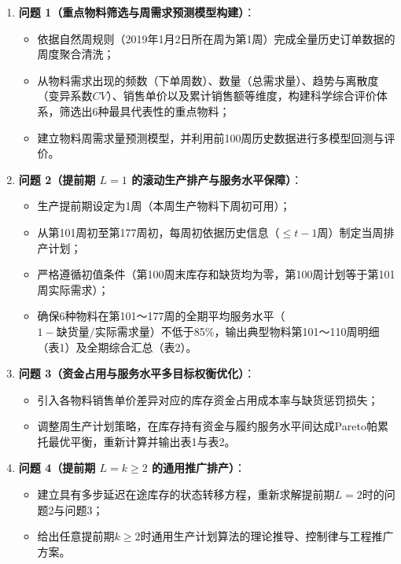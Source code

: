 \begin{enumerate}
\def\labelenumi{\arabic{enumi}.}
\tightlist
\item
  \textbf{问题 1（重点物料筛选与周需求预测模型构建）}：

  \begin{itemize}
  \tightlist
  \item
    依据自然周规则（2019年1月2日所在周为第1周）完成全量历史订单数据的周度聚合清洗；
  \item
    从物料需求出现的频数（下单周数）、数量（总需求量）、趋势与离散度（变异系数\(CV\)）、销售单价以及累计销售额等维度，构建科学综合评价体系，筛选出6种最具代表性的重点物料；
  \item
    建立物料周需求量预测模型，并利用前100周历史数据进行多模型回测与评价。
  \end{itemize}
\item
  \textbf{问题 2（提前期 \(L=1\) 的滚动生产排产与服务水平保障）}：

  \begin{itemize}
  \tightlist
  \item
    生产提前期设定为1周（本周生产物料下周初可用）；
  \item
    从第101周初至第177周初，每周初依据历史信息（\(\le t-1\)周）制定当周排产计划；
  \item
    严格遵循初值条件（第100周末库存和缺货均为零，第100周计划等于第101周实际需求）；
  \item
    确保6种物料在第101～177周的全期平均服务水平（\(1 - \text{缺货量}/\text{实际需求量}\)）不低于85\%，输出典型物料第101～110周明细（表1）及全期综合汇总（表2）。
  \end{itemize}
\item
  \textbf{问题 3（资金占用与服务水平多目标权衡优化）}：

  \begin{itemize}
  \tightlist
  \item
    引入各物料销售单价差异对应的库存资金占用成本率与缺货惩罚损失；
  \item
    调整周生产计划策略，在库存持有资金与履约服务水平间达成Pareto帕累托最优平衡，重新计算并输出表1与表2。
  \end{itemize}
\item
  \textbf{问题 4（提前期 \(L=k \ge 2\) 的通用推广排产）}：

  \begin{itemize}
  \tightlist
  \item
    建立具有多步延迟在途库存的状态转移方程，重新求解提前期\(L=2\)时的问题2与问题3；
  \item
    给出任意提前期\(k\ge 2\)时通用生产计划算法的理论推导、控制律与工程推广方案。
  \end{itemize}
\end{enumerate}
